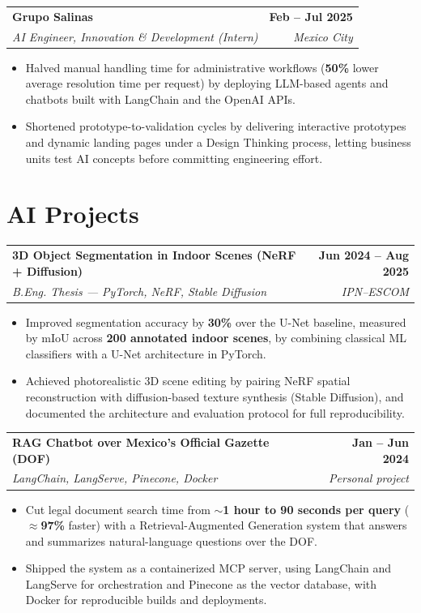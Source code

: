 \documentclass[letterpaper,10pt]{article}
\makeatletter
\newcommand{\role}[4]{%
  \vspace{2pt}%
  \begin{tabularx}{\textwidth}{@{}X r@{}}
    \textbf{#1} & \textbf{#2} \\
    \textit{#3} & \textit{#4} \\
  \end{tabularx}%
  \vspace{-2pt}%
}
\newenvironment{bullets}
  {\begin{itemize}[leftmargin=1.3em,itemsep=1pt,topsep=2pt,parsep=0pt,label=\textbullet]}
  {\end{itemize}}
\makeatother
\begin{document}
\role{Grupo Salinas}{Feb -- Jul 2025}
     {AI Engineer, Innovation \& Development (Intern)}{Mexico City}
\begin{bullets}
  \item Halved manual handling time for administrative workflows (\textbf{50\%} lower
        average resolution time per request) by deploying LLM-based agents and chatbots
        built with LangChain and the OpenAI APIs.
  \item Shortened prototype-to-validation cycles by delivering interactive prototypes and
        dynamic landing pages under a Design Thinking process, letting business units test
        AI concepts before committing engineering effort.
\end{bullets}

\section{AI Projects}

\role{3D Object Segmentation in Indoor Scenes (NeRF + Diffusion)}{Jun 2024 -- Aug 2025}
     {B.Eng. Thesis --- PyTorch, NeRF, Stable Diffusion}{IPN--ESCOM}
\begin{bullets}
  \item Improved segmentation accuracy by \textbf{30\%} over the U-Net baseline, measured
        by mIoU across \textbf{200 annotated indoor scenes}, by combining classical ML
        classifiers with a U-Net architecture in PyTorch.
  \item Achieved photorealistic 3D scene editing by pairing NeRF spatial reconstruction
        with diffusion-based texture synthesis (Stable Diffusion), and documented the
        architecture and evaluation protocol for full reproducibility.
\end{bullets}

\role{RAG Chatbot over Mexico's Official Gazette (DOF)}{Jan -- Jun 2024}
     {LangChain, LangServe, Pinecone, Docker}{Personal project}
\begin{bullets}
  \item Cut legal document search time from \textbf{$\sim$1 hour to 90 seconds per query}
        ($\approx$\textbf{97\%} faster) with a Retrieval-Augmented Generation system that
        answers and summarizes natural-language questions over the DOF.
  \item Shipped the system as a containerized MCP server, using LangChain and LangServe
        for orchestration and Pinecone as the vector database, with Docker for
        reproducible builds and deployments.
\end{bullets}
\end{document}
